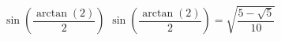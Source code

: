  {$\sin\left( \dfrac{\arctan(2)}{2} \right)$ }
{ $\sin\left( \dfrac{\arctan(2)}{2} \right) = \sqrt{\dfrac{5-\sqrt{5}}{10}}$ }
